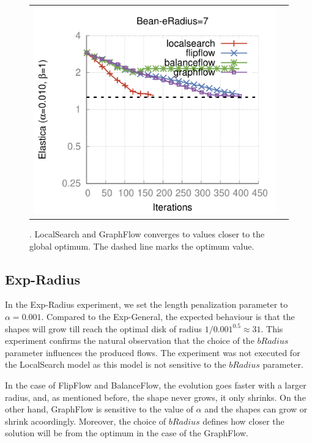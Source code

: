 \begin{figure}
\begin{tabular}{cc}
\includegraphics[scale=0.45]{figures/chapter9/free-elastica/plots/iteration/main_experiment/len_pen_0.01/radius-7/bean.pdf}
\end{tabular}
\caption{. LocalSearch and GraphFlow converges to values closer to the global optimum. The dashed line marks the optimum value.}
\label{ch9:fig:plots-free-elastica-general}
\end{figure}

\subsection{Exp-Radius}

In the Exp-Radius experiment, we set the length penalization parameter to $\alpha=0.001$. Compared to the Exp-General, the expected behaviour is that the shapes will grow till reach the optimal disk of radius $1/0.001^{0.5} \approx 31$. This experiment confirms the natural observation that the choice of the $bRadius$ parameter influences the produced flows. The experiment was not executed for the LocalSearch model as this model is not sensitive to the $bRadius$ parameter.

In the case of FlipFlow and BalanceFlow, the evolution goes faster with a larger radius, and, as mentioned before, the shape never grows, it only shrinks. On the other hand, GraphFlow is sensitive to the value of $\alpha$ and the shapes can grow or shrink acoordingly. Moreover, the choice of $bRadius$ defines how closer the solution will be from the optimum in the case of the GraphFlow.

